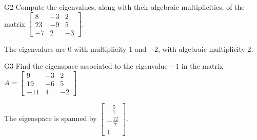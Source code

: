 \documentclass{sbgLAquiz}
\begin{document}
\begin{problem}{G2} 
Compute the eigenvalues, along with their algebraic multiplicities, of the matrix $ \begin{bmatrix} 8 & -3 & 2 \\ 23 & -9 & 5 \\ -7 & 2 & -3 \end{bmatrix}$.
\end{problem}
\begin{solution}
The eigenvalues are $0$ with multiplicity 1 and $-2$, with algebraic multiplicity 2.
\end{solution}

\begin{extract}\newpage\end{extract}
\begin{problem}{G3}
Find the eigenspace associated to the eigenvalue $-1$ in the matrix $A=\begin{bmatrix}9 & -3 & 2 \\ 19 & -6 & 5 \\ -11 & 4 & -2 \end{bmatrix}$
\end{problem}
\begin{solution}
The eigenspace is spanned by $\begin{bmatrix} -\frac{5}{7} \\ - \frac{12}{7} \\ 1 \end{bmatrix}$.
\end{solution}
\end{document}
